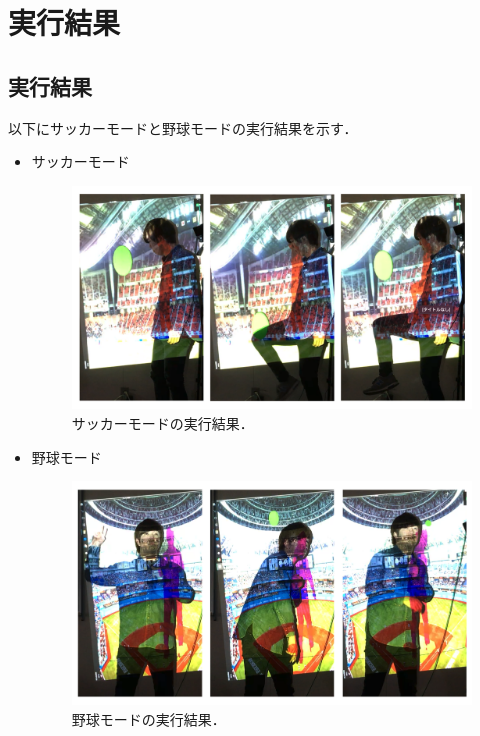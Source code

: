 \chapter{実行結果}
\thispagestyle{fancy}

\section{実行結果}
以下にサッカーモードと野球モードの実行結果を示す．
\begin{itemize}    
    \item サッカーモード
        \begin{figure}[htbp]
            \centering
            \includegraphics[width=12cm]{image/soccer_kekka.png}
            \caption[サッカーモードの実行結果]{サッカーモードの実行結果．}
            \label{soccer_kekkka}
        \end{figure}

\clearpage

    \item 野球モード
        \begin{figure}[htbp]
            \centering
            \includegraphics[width=12cm]{image/baseball_kekka.png}
            \caption[野球モードの実行結果]{野球モードの実行結果．}
        \label{baseball_kekka}
        \end{figure}
\end{itemize}